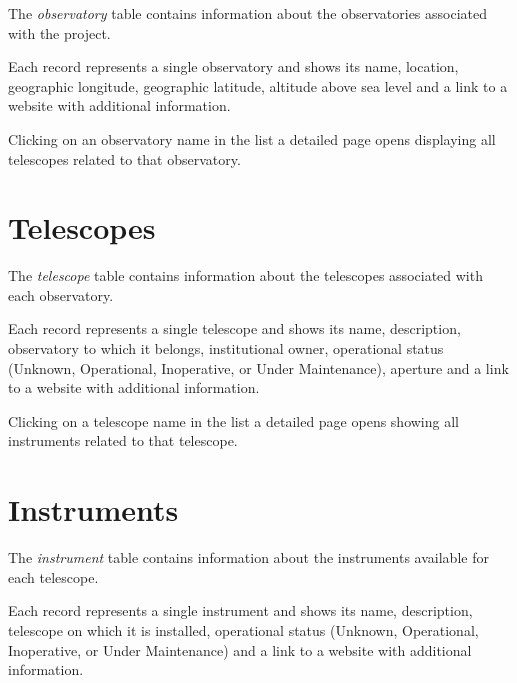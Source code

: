 The \textsl{observatory} table contains information about the observatories associated with the project. 

Each record represents a single observatory and shows its name, location, geographic longitude, geographic latitude, altitude above sea level and a link to a website with additional information. 


Clicking on an observatory name in the list a detailed page opens displaying all telescopes related to that observatory.


\section{Telescopes}

The \textsl{telescope} table contains information about the telescopes associated with each observatory. 

Each record represents a single telescope and shows its name, description, observatory to which it belongs, institutional owner, operational status (Unknown, Operational, Inoperative, or Under Maintenance), aperture and a link to a website with additional information. 


Clicking on a telescope name in the list a detailed page opens showing all instruments related to that telescope.


\section{Instruments}

The \textsl{instrument} table contains information about the instruments available for each telescope. 

Each record represents a single instrument and shows its name, description, telescope on which it is installed, operational status (Unknown, Operational, Inoperative, or Under Maintenance) and a link to a website with additional information. 



